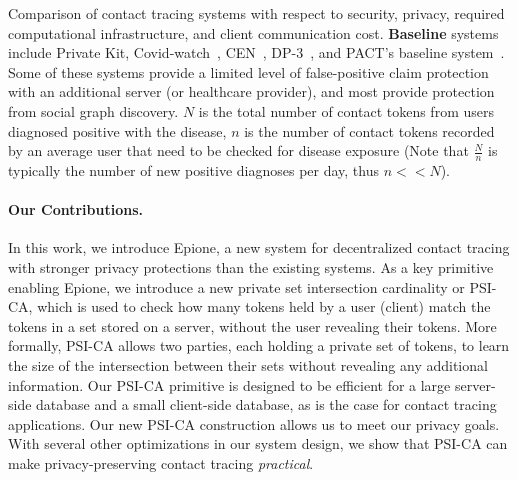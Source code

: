 \documentclass[11pt]{article} %
\newcommand{\dect}{\textsf{Epione}\xspace}
\newcommand{\psica}{PSI-CA\xspace}
\begin{document}
\begin{table}[]
	\caption{Comparison of contact tracing systems with respect to security, privacy, required computational infrastructure, and client communication cost. \textbf{Baseline} systems include Private Kit\cite{PrivateKit}, Covid-watch~\cite{Covid-watch}, CEN~\cite{CEN}, DP-3~\cite{DP-3T}, and PACT's baseline system~\cite{chan2020pact}. Some of these systems provide a limited level of false-positive claim protection with an additional server (or healthcare provider), and most provide protection from social graph discovery.  $N$ is the total number of contact tokens from users diagnosed positive with the disease, $n$ is the number of contact tokens recorded by an average user that need to be checked for disease exposure (Note that $\frac{N}{n}$ is typically the number of new positive diagnoses per day, thus $n<<N$).}
	
	\label{tbl:comp-complx}
\end{table}


\paragraph{Our Contributions.}

In this work, we introduce \dect, a new system for decentralized contact tracing with stronger privacy protections than the existing systems. As a key primitive enabling \dect, we introduce a new private set intersection cardinality or \psica, which is used to check how many tokens held by a user (client) match the tokens in a set stored on a server, without the user revealing their tokens. More formally, \psica allows two parties, each holding a private set of tokens, to learn the size of the intersection between their sets without revealing any additional information. Our \psica primitive is designed to be efficient for a large server-side database and a small client-side database, as is the case for contact tracing applications. 
Our new \psica construction allows us to meet our privacy goals.  With several other optimizations in our system design, we show that \psica can make privacy-preserving contact tracing \emph{practical}. 
\end{document}
